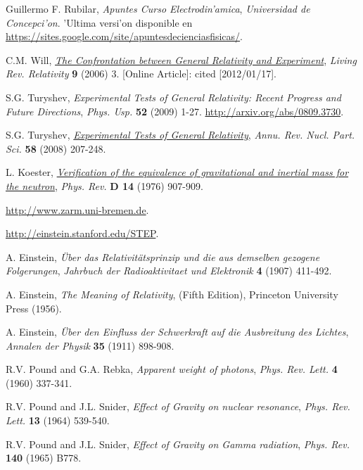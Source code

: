 \begin{thebibliography}{99}


Guillermo F. Rubilar, {\it Apuntes Curso Electrodin'amica}, {\sl
Universidad de Concepci'on}. 'Ultima versi'on disponible en \url{https://sites.google.com/site/apuntesdecienciasfisicas/}.

 C.M. Will, \href{http://www.livingreviews.org/lrr-2006-3}{\em The Confrontation between General Relativity and Experiment}, {\sl Living Rev. Relativity} {\bf 9} (2006) 3. [Online Article]: cited [2012/01/17].

 S.G. Turyshev, {\em Experimental Tests of General Relativity: Recent Progress and Future Directions}, {\sl Phys. Usp.} {\bf 52} (2009) 1-27. \url{http://arxiv.org/abs/0809.3730}.

 S.G. Turyshev, \href{http://www.annualreviews.org/doi/abs/10.1146/annurev.nucl.58.020807.111839}{\em Experimental Tests of General Relativity}, {\sl Annu. Rev. Nucl. Part. Sci.} {\bf 58} (2008) 207-248. 

 L. Koester, \href{http://dx.doi.org/10.1103/PhysRevD.14.907}{\em Verification of the equivalence of gravitational and inertial mass for the neutron}, {\sl Phys. Rev.} {\bf D 14} (1976) 907-909.

 \url{http://www.zarm.uni-bremen.de}.

 \url{http://einstein.stanford.edu/STEP}.

 A. Einstein, {\it \"Uber das Relativit\"atsprinzip und die aus demselben gezogene Folgerungen}, {\sl Jahrbuch der Radioaktivitaet und Elektronik} {\bf 4} (1907) 411-492.

 A. Einstein, \emph{The Meaning of Relativity}, (Fifth
Edition), Princeton University Press (1956).

 A. Einstein, {\it \"Uber den Einfluss der Schwerkraft auf die Ausbreitung des Lichtes}, {\sl Annalen der Physik} {\bf 35} (1911) 898-908.

 R.V. Pound and G.A. Rebka, {\em Apparent weight of photons}, {\sl Phys. Rev. Lett.} {\bf 4} (1960) 337-341.

 R.V. Pound and J.L. Snider, {\em Effect of Gravity on nuclear resonance}, {\sl Phys. Rev. Lett.} {\bf 13} (1964) 539-540.

 R.V. Pound and J.L. Snider, {\em Effect of Gravity on Gamma radiation}, {\sl Phys. Rev.} {\bf 140} (1965) B778.


\end{thebibliography}
